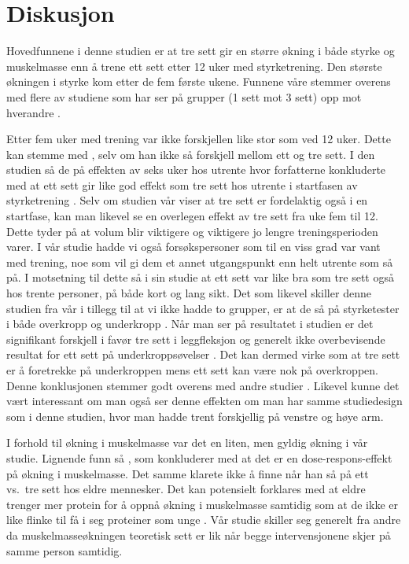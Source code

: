 \documentclass[
]{book}
\begin{document}
\hypertarget{diskusjon-1}{%
\section{Diskusjon}\label{diskusjon-1}}

Hovedfunnene i denne studien er at tre sett gir en større økning i både styrke og muskelmasse enn å trene ett sett etter 12 uker med styrketrening. Den største økningen i styrke kom etter de fem første ukene. Funnene våre stemmer overens med flere av studiene som har ser på grupper (1 sett mot 3 sett) opp mot hverandre \citep{krieger2009, galvão2005, schoenfeld2016}.

Etter fem uker med trening var ikke forskjellen like stor som ved 12 uker. Dette kan stemme med \citet{radaelli2014}, selv om han ikke så forskjell mellom ett og tre sett. I den studien så de på effekten av seks uker hos utrente hvor forfatterne konkluderte med at ett sett gir like god effekt som tre sett hos utrente i startfasen av styrketrening \citep{radaelli2014}. Selv om studien vår viser at tre sett er fordelaktig også i en startfase, kan man likevel se en overlegen effekt av tre sett fra uke fem til 12. Dette tyder på at volum blir viktigere og viktigere jo lengre treningsperioden varer. I vår studie hadde vi også forsøkspersoner som til en viss grad var vant med trening, noe som vil gi dem et annet utgangspunkt enn helt utrente som \citet{radaelli2014} så på. I motsetning til dette så \citet{hass2000} i sin studie at ett sett var like bra som tre sett også hos trente personer, på både kort og lang sikt. Det som likevel skiller denne studien fra vår i tillegg til at vi ikke hadde to grupper, er at de så på styrketester i både overkropp og underkropp \citep{hass2000}. Når man ser på resultatet i studien er det signifikant forskjell i favør tre sett i leggfleksjon og generelt ikke overbevisende resultat for ett sett på underkroppsøvelser \citep{hass2000}. Det kan dermed virke som at tre sett er å foretrekke på underkroppen mens ett sett kan være nok på overkroppen. Denne konklusjonen stemmer godt overens med andre studier \citep{rønnestad2007, paulsen2003}. Likevel kunne det vært interessant om man også ser denne effekten om man har samme studiedesign som i denne studien, hvor man hadde trent forskjellig på venstre og høye arm.

I forhold til økning i muskelmasse var det en liten, men gyldig økning i vår studie. Lignende funn så \citet{schoenfeld2019}, som konkluderer med at det er en dose-respons-effekt på økning i muskelmasse. Det samme klarete ikke \citet{galvão2005} å finne når han så på ett vs.~tre sett hos eldre mennesker. Det kan potensielt forklares med at eldre trenger mer protein for å oppnå økning i muskelmasse samtidig som at de ikke er like flinke til få i seg proteiner som unge \citep{kraemer1999, moore2015}. Vår studie skiller seg generelt fra andre da muskelmasseøkningen teoretisk sett er lik når begge intervensjonene skjer på samme person samtidig.
\end{document}
